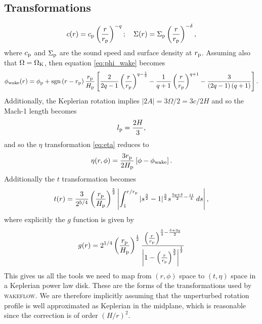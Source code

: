 \subsection{Transformations}

\begin{align}
    c(r) = c_{\rm p} \left(\frac{r}{r_{\rm p}}\right)^{-q}; \quad \Sigma(r) = \Sigma_{\rm p} \left(\frac{r}{r_{\rm p}}\right)^{-\delta},
\end{align}
where $c_{\rm p}$ and $\Sigma_{\rm p}$ are the sound speed and surface density at $r_{\rm p}$.
Assuming also that $\Omega=\Omega_{\rm K}$, then equation \ref{eq:phi_wake} becomes \citep{rafikov2002a}
\begin{align}
    \phi_{\rm wake}(r) = \phi_{\rm p} + {\rm sgn} \left( r - r_{\rm p} \right) \frac{r_{\rm p}}{H_{\rm p}} \left[ \frac{2}{2q-1} \left(\frac{r}{r_{\rm p}}\right)^{q-\frac{1}{2}} - \frac{1}{q+1} \left(\frac{r}{r_{\rm p}}\right)^{q+1} - \frac{3}{\left(2q-1\right)\left(q+1\right)} \right].
\end{align}
Additionally, the Keplerian rotation implies $|2A| = 3\Omega/2 = 3c/2H$ and so the Mach-1 length becomes
\begin{align}
    l_{\rm p} = \frac{2H}{3},
\end{align}
and so the $\eta$ transformation \ref{eq:eta} reduces to 
\begin{align}
    \eta(r, \phi) = \frac{3 r_{\rm p}}{2 H_{\rm p}} \left[ \phi - \phi_{\rm wake} \right].
\end{align}
Additionally the $t$ transformation becomes \citep{rafikov2002a}
\begin{align}
    t(r) = \frac{3}{2^{5/4}} \left( \frac{r_{\rm p}}{H_{\rm p}} \right)^{\frac{5}{2}} \left| \int_1^{r/r_{\rm p}} |s^\frac{3}{2} - 1|^\frac{3}{2} s^{\frac{5q+\delta}{2}-\frac{11}{4}}\, ds \right|, \label{eq:t_power}
\end{align}
where explicitly the $g$ function is given by \citep{bollati2021}
\begin{align}
    g(r) = 2^{1/4} \left( \frac{r_{\rm p}}{H_{\rm p}} \right)^{\frac{1}{2}} \frac{\left( \frac{r}{r_{\rm p}} \right)^{\frac{5}{4} - \frac{\delta + 3q}{2}}}{\left| 1 - \left(\frac{r}{r_{\rm p}}\right)^\frac{3}{2} \right|^\frac{1}{2}}
\end{align}
This gives us all the tools we need to map from $(r,\phi)$ space to $(t,\eta)$ space in a Keplerian power law disk.
These are the forms of the transformations used by \textsc{wakeflow}.
We are therefore implicitly assuming that the unperturbed rotation profile is well approximated as Keplerian in the midplane, which is reasonable since the correction is of order $\left(H/r\right)^2$.

